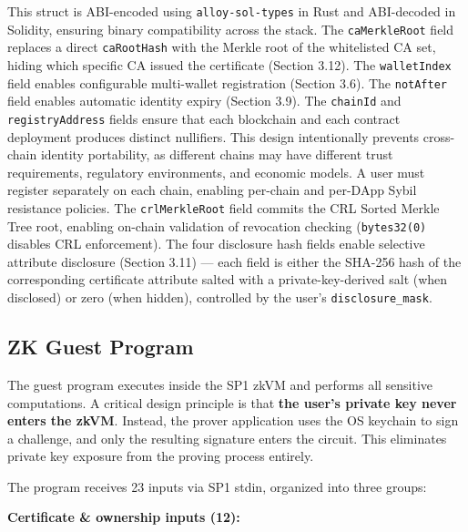 \documentclass[11pt, a4paper]{article}
\begin{document}
This struct is ABI-encoded using \texttt{alloy-sol-types} in Rust and
ABI-decoded in Solidity, ensuring binary compatibility across the stack.
The \texttt{caMerkleRoot} field replaces a direct \texttt{caRootHash}
with the Merkle root of the whitelisted CA set, hiding which specific CA
issued the certificate (Section 3.12). The \texttt{walletIndex} field
enables configurable multi-wallet registration (Section 3.6). The
\texttt{notAfter} field enables automatic identity expiry (Section 3.9).
The \texttt{chainId} and \texttt{registryAddress} fields ensure that
each blockchain and each contract deployment produces distinct
nullifiers. This design intentionally prevents cross-chain identity
portability, as different chains may have different trust requirements,
regulatory environments, and economic models. A user must register
separately on each chain, enabling per-chain and per-DApp Sybil
resistance policies. The \texttt{crlMerkleRoot} field commits the CRL
Sorted Merkle Tree root, enabling on-chain validation of revocation
checking (\texttt{bytes32(0)} disables CRL enforcement). The four
disclosure hash fields enable selective attribute disclosure (Section
3.11) --- each field is either the SHA-256 hash of the corresponding
certificate attribute salted with a private-key-derived salt (when
disclosed) or zero (when hidden), controlled by the user's
\texttt{disclosure\_mask}.

\subsection{ZK Guest Program}\label{zk-guest-program}

The guest program executes inside the SP1 zkVM and performs all
sensitive computations. A critical design principle is that \textbf{the
user's private key never enters the zkVM}. Instead, the prover application
uses the OS keychain to sign a challenge, and only the resulting
signature enters the circuit. This eliminates private key exposure from
the proving process entirely.

The program receives 23 inputs via SP1 stdin, organized into three
groups:

\textbf{Certificate \& ownership inputs (12):}
\end{document}
